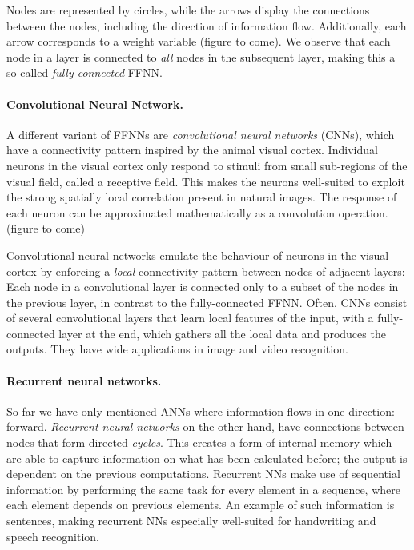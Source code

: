 Nodes are represented by circles, while the arrows display the
connections between the nodes, including the direction of information
flow. Additionally, each arrow corresponds to a weight variable
(figure to come).  We observe that each node in a layer is connected
to \emph{all} nodes in the subsequent layer, making this a so-called
\emph{fully-connected} FFNN.

\paragraph{Convolutional Neural Network.}
A different variant of FFNNs are \emph{convolutional neural networks}
(CNNs), which have a connectivity pattern inspired by the animal
visual cortex. Individual neurons in the visual cortex only respond to
stimuli from small sub-regions of the visual field, called a receptive
field. This makes the neurons well-suited to exploit the strong
spatially local correlation present in natural images. The response of
each neuron can be approximated mathematically as a convolution
operation.  (figure to come)

Convolutional neural networks emulate the behaviour of neurons in the
visual cortex by enforcing a \emph{local} connectivity pattern between
nodes of adjacent layers: Each node in a convolutional layer is
connected only to a subset of the nodes in the previous layer, in
contrast to the fully-connected FFNN.  Often, CNNs consist of several
convolutional layers that learn local features of the input, with a
fully-connected layer at the end, which gathers all the local data and
produces the outputs. They have wide applications in image and video
recognition.

\paragraph{Recurrent neural networks.}
So far we have only mentioned ANNs where information flows in one
direction: forward. \emph{Recurrent neural networks} on the other hand,
have connections between nodes that form directed \emph{cycles}. This
creates a form of internal memory which are able to capture
information on what has been calculated before; the output is
dependent on the previous computations. Recurrent NNs make use of
sequential information by performing the same task for every element
in a sequence, where each element depends on previous elements. An
example of such information is sentences, making recurrent NNs
especially well-suited for handwriting and speech recognition.

